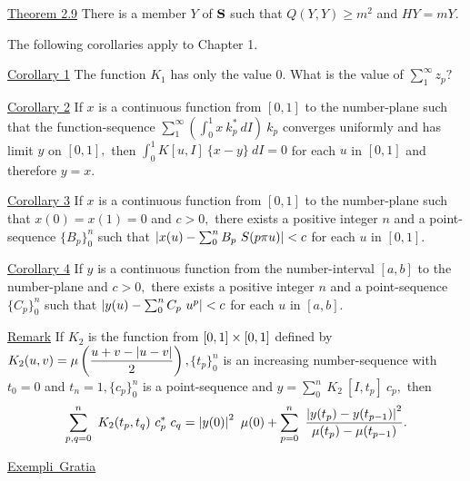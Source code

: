 \underline{Theorem 2.9}  There is a member $Y$ of $\textbf{S}$ such that $Q(Y, Y) \geq m^{2}$ and $HY = mY.$\nl

\begin{center}
The following corollaries apply to Chapter 1.
\end{center}

\underline{Corollary 1}  The function $K_{1}$ has only the value $0$.  What is the value of $\sum_{1}^{\infty} z_{p} ?$\nl

\underline{Corollary 2}  If $x$ is a continuous function from $[0, 1]$ to the number-plane
such that the function-sequence $\sum_{1}^{\infty} (\int_{0}^{1} x~k_{p}^{*}~dI)~k_{p}$ converges uniformly and has limit $y$ on $[0, 1],$ then $\int_{0}^{1} K[u, I]~\{x - y\}~dI = 0$ for each $u$ in $[0,1]$ and therefore $y = x.$\nl

\underline{Corollary 3}  If $x$ is a continuous function from $[0, 1]$ to the number-plane such that $x(0) = x(1) = 0$ and $c > 0,$ there exists a positive integer $n$ and a point-sequence $\{B_{p}\}_{0}^{n}$ such that
$\left|x(u) - \sum_{0}^{n} B_{p}~S(p\pi u)\right| < c $ for each $u$ in $[0, 1].$\nl

\underline{Corollary 4}  If $y$ is a continuous function from the number-interval $[a, b]$ to the number-plane and $c > 0,$ there exists a positive integer $n$ and a point-sequence $\{C_{p}\}_{0}^{n}$ such that $\left|y(u) - \sum_{0}^{n} C_{p}~u^{p}\right| < c$ for each $u$ in $[a, b].$\nl

\underline{Remark}  If $K_{2}$ is the function from $[0, 1] \times [0,1]$ defined by $K_{2}(u, v) = \mu \left(\dfrac{u + v - \left|u - v\right|}{2}\right),$\nl$ \{t_{p}\}_{0}^{n}$ is an increasing number-sequence with $t_{0} = 0$ and $t_{n} = 1, \{c_{p}\}_{0}^{n}$ is a point-sequence and $y = \sum_{0}^{n}~K_{2}~[I, t_{p}]~c_{p},$ then
\[
\sum_{p,q=0}^{n}~K_{2}(t_{p},t_{q})~c_{p}^{*}~c_{q} = \left|y(0)\right|^{2}~\mu(0) + \sum_{p=0}^{n} ~\dfrac{\left|y(t_{p}) - y(t_{p-1})\right|^{2}}{\mu(t_{p}) - \mu(t_{p-1})}.
\]



\begin{center}
\underline{Exempli~Gratia}
\end{center}

